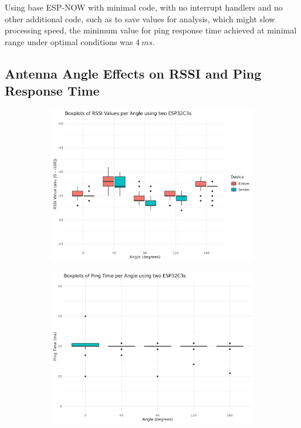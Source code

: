 Using base ESP-NOW with minimal code, with no interrupt handlers and no other additional code, such as to save values for analysis, which might slow processing speed, the minimum value for ping response time achieved at minimal range under optimal conditions was $4\ ms$.

\subsection{\label{sec:res_angle}Antenna Angle Effects on RSSI and Ping Response Time}

\begin{figure}[H]
    \centering
    \begin{subfigure}{0.45\textwidth}
        \includegraphics[width=\linewidth]{rstudio/analysis/plots/angle_rssi_box.png}
    \end{subfigure}
    \begin{subfigure}{0.45\textwidth}
        \includegraphics[width=\linewidth]{rstudio/analysis/plots/angle_ping_box.png}

\end{subfigure}
\end{figure}
